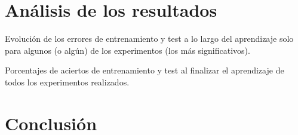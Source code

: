 \documentclass{uc3mpracticas}
\begin{document}
\section{Análisis de los resultados}

Evolución de los errores de entrenamiento y test a lo largo del aprendizaje solo para algunos (o algún) de los experimentos (los más significativos).


Porcentajes de aciertos de entrenamiento y test al finalizar el aprendizaje de todos los experimentos realizados.

\section{Conclusión}
\end{document}
